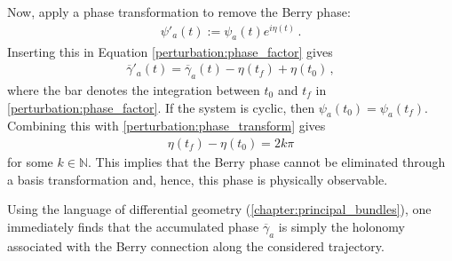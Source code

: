     Now, apply a phase transformation to remove the Berry phase:
    \begin{gather}
        \label{perturbation:phase_transform}
        \psi'_a(t) := \psi_a(t)e^{i\eta(t)}\,.
    \end{gather}
    Inserting this in Equation \eqref{perturbation:phase_factor} gives
    \begin{gather}
        \overline{\gamma}'_a(t) = \overline{\gamma}_a(t) - \eta(t_f) + \eta(t_0)\,,
    \end{gather}
    where the bar denotes the integration between $t_0$ and $t_f$ in \cref{perturbation:phase_factor}. If the system is cyclic, then $\psi_a(t_0) = \psi_a(t_f)$. Combining this with \cref{perturbation:phase_transform} gives
    \begin{gather}
        \eta(t_f) - \eta(t_0) = 2k\pi
    \end{gather}
    for some $k\in\mathbb{N}$. This implies that the Berry phase cannot be eliminated through a basis transformation and, hence, this phase is physically observable.

    \begin{remark}[$\clubsuit$]
        Using the language of differential geometry (\cref{chapter:principal_bundles}), one immediately finds that the accumulated phase $\overline{\gamma}_a$ is simply the holonomy associated with the Berry connection along the considered trajectory.
    \end{remark}